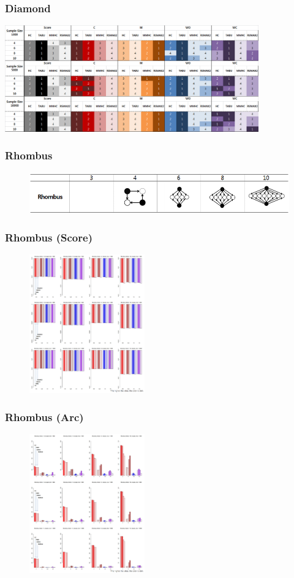 \documentclass{beamer}
\begin{document}
\begin{frame}
\frametitle{Diamond}
{\scriptsize{}
	\begin{center}
		\includegraphics[height=130pt]{images/Result_Diamond}
	\end{center}
}
\end{frame}


\begin{frame}
\frametitle{Rhombus}
{\scriptsize{}
	\begin{figure}
		\includegraphics[height=50pt]{images/Topologies_Rhombus}
	\end{figure}	
}
\end{frame}



\begin{frame}
\frametitle{Rhombus (Score)}
{\scriptsize{}
	\begin{figure}
		\includegraphics[height=170pt]{images/06_Rhombus_Score}
	\end{figure}	
}
\end{frame}


\begin{frame}
\frametitle{Rhombus (Arc)}
{\scriptsize{}
	\begin{figure}
		\includegraphics[height=170pt]{images/06_Rhombus_Arcs}
	\end{figure}	
}
\end{frame}
\end{document}
